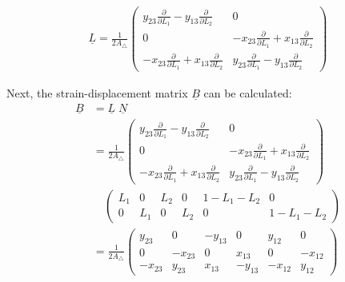   \begin{align}
  \underline{L} = \frac{1}{2 A_\triangle} \begin{pmatrix}
  y_{23}\frac{\partial}{\partial L_1} - y_{13}\frac{\partial}{\partial L_2} & 0 \\
  0 & -x_{23}\frac{\partial}{\partial L_1} + x_{13}\frac{\partial}{\partial L_2} \\
  -x_{23}\frac{\partial}{\partial L_1} + x_{13}\frac{\partial}{\partial L_2} & y_{23}\frac{\partial}{\partial L_1} - y_{13}\frac{\partial}{\partial L_2}
  \end{pmatrix}
  \end{align}
  
  Next, the strain-displacement matrix $\underline{B}$ can be calculated:
  \begin{align}
  \underline{B} &= \underline{L}\; \underline{N} \nonumber\\
  &= \frac{1}{2 A_\triangle} \begin{pmatrix}
  y_{23}\frac{\partial}{\partial L_1} - y_{13}\frac{\partial}{\partial L_2} & 0 \\
  0 & -x_{23}\frac{\partial}{\partial L_1} + x_{13}\frac{\partial}{\partial L_2} \\
  -x_{23}\frac{\partial}{\partial L_1} + x_{13}\frac{\partial}{\partial L_2} & y_{23}\frac{\partial}{\partial L_1} - y_{13}\frac{\partial}{\partial L_2}
  \end{pmatrix} \nonumber\\
  & \quad \begin{pmatrix}
  L_1 & 0 & L_2 & 0 & 1-L_1-L_2 & 0 \\
  0 & L_1 & 0 & L_2 & 0 & 1-L_1-L_2
  \end{pmatrix} \nonumber\\
  &= \frac{1}{2 A_\triangle} \begin{pmatrix}
  y_{23} & 0 & -y_{13} & 0 & y_{12} & 0 \\
  0 & -x_{23} & 0 & x_{13} & 0 & -x_{12} \\
  -x_{23} & y_{23} & x_{13} & -y_{13} & -x_{12} & y_{12}
  \end{pmatrix}
  \end{align}
  
